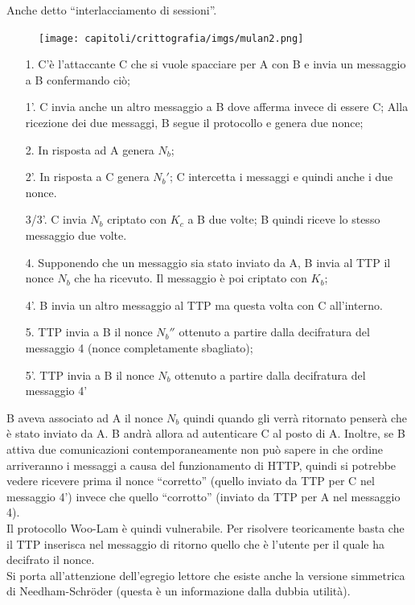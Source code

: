 Anche detto ``interlacciamento di sessioni''.
\begin{figure}[H]
    \centering
    \texttt{[image: capitoli/crittografia/imgs/mulan2.png]}
\end{figure}
\begin{enumerate}
    \item[1.] C'è l'attaccante C che si vuole spacciare per A con
        B e invia un messaggio a B confermando ciò;
    \item[1'.] C invia anche un altro messaggio a B dove
        afferma invece di essere C; Alla ricezione dei due
        messaggi, B segue il protocollo e genera due nonce;
    \item[2.] In risposta ad A genera \(N_b\);
    \item[2'.] In risposta a C genera \(N_b'\);
        C intercetta i messaggi e quindi anche i due nonce.
    \item[3/3'.] C invia \(N_b\) criptato con \(K_c\) a B due volte;
        B quindi riceve lo stesso messaggio due volte.
    \item[4.] Supponendo che un messaggio sia stato inviato
        da A, B invia al TTP il nonce \(N_b\) che ha ricevuto. Il
        messaggio è poi criptato con \(K_b\);
    \item[4'.] B invia un altro messaggio al TTP ma questa
        volta con C all'interno.
    \item[5.] TTP invia a B il nonce \(N_b''\) ottenuto a partire dalla
        decifratura del messaggio 4 (nonce completamente
        sbagliato);
    \item[5'.] TTP invia a B il nonce \(N_b\) ottenuto a partire dalla
        decifratura del messaggio 4'
\end{enumerate}

B aveva associato ad A il nonce \(N_b\) quindi quando gli verrà ritornato penserà che è stato inviato da A. B andrà allora ad autenticare C al posto di A. Inoltre, se B attiva due comunicazioni contemporaneamente non può sapere in che ordine arriveranno i messaggi a causa del funzionamento di HTTP, quindi si potrebbe vedere ricevere prima il nonce ``corretto'' (quello inviato da TTP per C nel messaggio 4') invece che quello ``corrotto'' (inviato da TTP per A nel messaggio 4).\\

Il protocollo Woo-Lam è quindi vulnerabile. Per risolvere teoricamente basta che il TTP inserisca nel messaggio di ritorno quello che è l'utente per il quale ha decifrato il nonce.\\

Si porta all'attenzione dell'egregio lettore che esiste anche la versione
simmetrica di Needham-Schröder (questa è un informazione dalla
dubbia utilità).